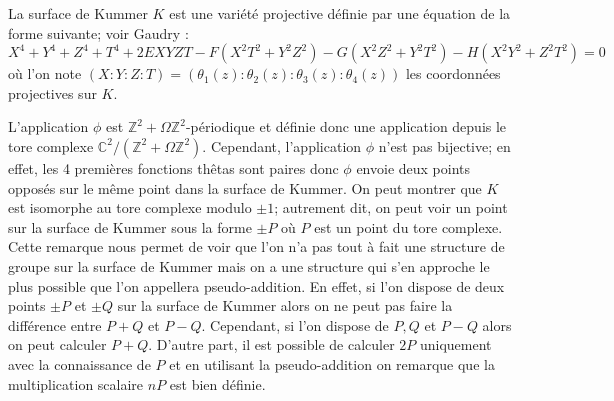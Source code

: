 \documentclass[a4paper]{article}
\theoremstyle{definition}
\theoremstyle{remark}
\numberwithin{equation}{section}
\begin{document}
La surface de Kummer $K$ est une variété projective définie par une équation de la forme suivante; voir Gaudry \cite{gaudry} :
$$X^4+Y^4+Z^4+T^4+2EXYZT-F(X^2T^2+Y^2Z^2)-G(X^2Z^2+Y^2T^2)-H(X^2Y^2+Z^2T^2)=0$$
où l'on note $(X:Y:Z:T)=(\theta_1(z):\theta_2(z):\theta_3(z):\theta_4(z))$ les coordonnées projectives sur $K$.

L'application $\phi$ est $\mathbb{Z}^2 + \Omega\mathbb{Z}^2$-périodique et définie donc une application depuis le tore complexe $\mathbb{C}^2/(\mathbb{Z}^2+\Omega\mathbb{Z}^2)$. Cependant, l'application $\phi$ n'est pas bijective; en effet, les 4 premières fonctions thêtas sont paires donc $\phi$ envoie deux points opposés sur le même point dans la surface de Kummer. On peut montrer que $K$ est isomorphe au tore complexe modulo ${\pm 1}$; autrement dit, on peut voir un point sur la surface de Kummer sous la forme $\pm P$ où $P$ est un point du tore complexe. Cette remarque nous permet de voir que l'on n'a pas tout à fait une structure de groupe sur la surface de Kummer mais on a une structure qui s'en approche le plus possible que l'on appellera pseudo-addition. En effet, si l'on dispose de deux points $\pm P$ et $\pm Q$ sur la surface de Kummer alors on ne peut pas faire la différence entre $P+Q$ et $P-Q$. Cependant, si l'on dispose de $P,Q$ et $P-Q$ alors on peut calculer $P+Q$. D'autre part, il est possible de calculer $2P$ uniquement avec la connaissance de $P$ et en utilisant la pseudo-addition on remarque que la multiplication scalaire $nP$ est bien définie.




\end{document}
